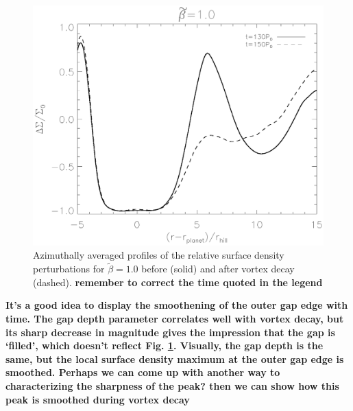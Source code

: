 \begin{figure}
  \includegraphics[width=\linewidth]{figures/gapchange}
  \caption{Azimuthally averaged profiles of the relative surface
    density perturbations for  $\tilde\beta=1.0$
    before (solid) and after vortex decay
    (dashed). {\bf remember to correct the time quoted in the
      legend} \label{gap_smoothed}}  
\end{figure}

{\bf It's a good idea to display the smoothening of the outer gap
  edge with time. 
  The gap depth parameter correlates
  well with vortex decay, but its sharp decrease in magnitude gives
  the impression that the gap is 
  `filled', which doesn't reflect Fig. \ref{gap_smoothed}. Visually,
  the gap depth is the same, but the local surface density maximum at
  the outer gap edge is smoothed. Perhaps we can come up with another
  way to characterizing the sharpness of the peak? then we can show
  how this peak is smoothed during vortex decay
}



